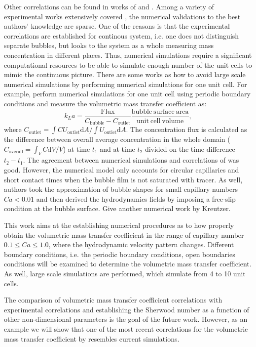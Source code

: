 \documentclass{article}
\newcommand{\uoutlet}{U_{\mathrm{outlet}}}
\newcommand{\cbubble}{C_{\mathrm{bubble}}}
\newcommand{\coutlet}{C_{\mathrm{outlet}}}
\newcommand{\coverall}{C_{\mathrm{overall}}}
\begin{document}
Other correlations can be found in works of \citet{kreutzer-overview}
and \citet{bercic-mass}. Among a variety of experimental works extensively covered
\cite{yue-mass}, the numerical validations to the best authors' knowledge are sparse. One of the
reasons is that the experimental correlations are established for continous system, i.e. one does
not distinguish separate bubbles, but looks to the system as a whole measuring mass concentration
in different places. Thus, numerical simulations require a significant computational
resources to be able to simulate enough number of the unit cells to mimic the continuous picture.
There are some works as how to avoid large scale numerical simulations by performing numerical
simulations for one unit cell. For example, \citet{vanbaten-circular} perform numerical
simulations for one unit cell using periodic boundary conditions and measure the volumetric mass
transfer coefficient as:
\begin{equation}
\label{main:simulation:equation}
k_L a=\frac{\mathrm{Flux}}{\cbubble-\coutlet} \frac{\mathrm{bubble\ surface\ area}}{\mathrm{unit\
cell\ volume}},
\end{equation}
where $\coutlet=\int{C \uoutlet \mathrm{d}A}/\int{\uoutlet\mathrm{d}A}$. 
The concentration flux is calculated as the difference between overall
average concentration in the whole domain ($\coverall=\int_{V} C \mathrm{d}V /V$)
at time
$t_1$ and at time $t_2$ divided on the time difference $t_2-t_1$. The agreement between numerical
simulations and correlations of \citet{bercic-mass} was good. However, the numerical model only
accounts for circular capillaries and short contact times when the
bubble film is not saturated with tracer. As well, authors took the
approximation of bubble shapes for small capillary numbers $Ca<0.01$ and then derived the
hydrodynamics fields by imposing a free-slip condition at the bubble surface. {\color{red} Give
another numerical work by Kreutzer.} 

This work aims at the establishing numerical procedures as to how properly obtain the volumetric
mass transfer coefficient in the range of capillary number $0.1\leq Ca\leq 1.0$, where the
hydrodynamic velocity pattern changes. Different boundary conditions, i.e. the periodic boundary
conditions, open boundaries conditions will be examined to determine the volumetric mass transfer
coefficient. As well, large scale simulations are performed, which simulate from 4 to 10 unit
cells.

The comparison of volumetric mass transfer coefficient
correlations with experimental correlations and establishing the Sherwood number as a function of
other non-dimensional parameters is the goal of the future work. However, as an example we will
show that one of the most recent correlations for the volumetric mass transfer coefficient by
\citet{yue-mass} resembles current simulations.
\end{document}
